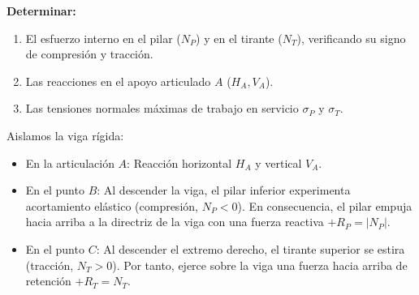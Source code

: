 {\begin{center}
{%
        }
    \end{center}

    \textbf{Determinar:}
    \begin{enumerate}[label=\alph*)]
        \item El esfuerzo interno en el pilar ($N_P$) y en el tirante ($N_T$), verificando su signo de compresión y tracción.
        \item Las reacciones en el apoyo articulado $A$ ($H_A, V_A$).
        \item Las tensiones normales máximas de trabajo en servicio $\sigma_P$ y $\sigma_T$.
    \end{enumerate}

    \tcblower


    Aislamos la viga rígida:
    \begin{itemize}
        \item En la articulación $A$: Reacción horizontal $H_A$ y vertical $V_A$.
        \item En el punto $B$: Al descender la viga, el pilar inferior experimenta acortamiento elástico (compresión, $N_P < 0$). En consecuencia, el pilar empuja hacia arriba a la directriz de la viga con una fuerza reactiva $+R_P = |N_P|$.
        \item En el punto $C$: Al descender el extremo derecho, el tirante superior se estira (tracción, $N_T > 0$). Por tanto, ejerce sobre la viga una fuerza hacia arriba de retención $+R_T = N_T$.
    \end{itemize}

}
